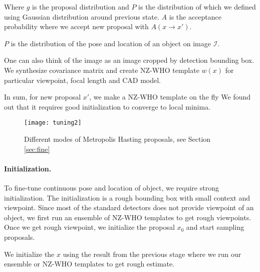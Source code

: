 Where $g$ is the proposal distribution and $P$ is the distribution of which we
defined using Gaussian distribution around previous state. $A$ is the
acceptance probability where we accept new proposal with $A(x \rightarrow x')$.


$P$ is the distribution of the pose and location of an object on image
$\mathcal{I}$.

One can also think of the image as an image cropped by detection
bounding box. We synthesize covariance matrix and create NZ-WHO
template $w(x)$ for particular viewpoint, focal length and CAD model.



In sum, for new proposal $x'$, we make a NZ-WHO template on the fly 
We found out that it requires good initialization to converge to local minima. 


\begin{figure}[t]
\centering
    \texttt{[image: tuning2]} \\ [-5pt]
    \caption{Different modes of Metropolis Hasting proposals, see Section \ref{sec:fine}}
 \label{fig:tuningmode}
\end{figure}


\paragraph{Initialization.}
To fine-tune continuous pose and location of object, we require strong
initialization. The initialization is a rough bounding box with small context
and viewpoint. Since most of the standard detectors does not provide viewpoint
of an object, we first run an ensemble of NZ-WHO templates to get rough
viewpoints. Once we get rough viewpoint, we initialize the proposal $x_0$ and
start sampling proposals.

We initialize the $x$ using the result from the previous stage where
we run our ensemble or NZ-WHO templates to get rough estimate.